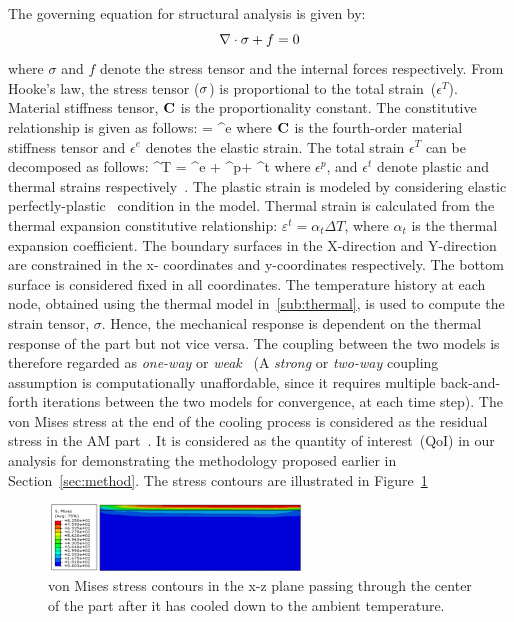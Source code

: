 The governing equation for structural analysis \cite{Megahed:2016} is given by:
%
\begin{equation}\label{eq_mechanical}
\nabla \cdot \mathbf{{\sigma}}+f = 0
\end{equation}
%
where $\sigma$ and $f$ denote the stress tensor and the internal forces respectively. From Hooke's law, the stress
tensor ($\mathbf{{\sigma}}$) is proportional to the total strain~($\epsilon^T$). Material stiffness tensor, $\mathbf{{C}}$ is the
proportionality constant. The constitutive relationship is given as follows:
%
\be
\mat{\sigma} = \epsilon^e
\ee
%
where $\mathbf{{C}}$ is the fourth-order material stiffness tensor and $\epsilon^e$ denotes
the elastic strain. The total strain 
$\epsilon^T$ can be decomposed as follows:
%
\be
\epsilon^T = \epsilon^e + \epsilon^p+ \epsilon^t
\ee
%
where $\epsilon^p$, and $\epsilon^t$ denote
plastic and thermal strains respectively~\cite{Megahed:2016}. 
The plastic strain is modeled by considering elastic 
perfectly-plastic~\cite{Zhao:2015} condition in the model. Thermal strain is calculated  from the thermal expansion 
constitutive relationship: $\varepsilon^t = \alpha_{t}\Delta T$, where $\alpha_t $ is the thermal expansion coefficient.
The boundary surfaces in the X-direction and Y-direction are constrained in the x-
coordinates and y-coordinates respectively. The bottom surface is considered fixed in all coordinates.
The temperature history at each node, obtained using the thermal model in~\ref{sub:thermal}, is used to
compute the strain tensor, $\sigma$. Hence, the mechanical response is dependent on the thermal response
of the part but not vice versa. The coupling between the two models is therefore regarded as \textit{one-way}
or \textit{weak}~\cite{Debroy:2017} (A \textit{strong} or \textit{two-way} coupling assumption is computationally
unaffordable, since it requires multiple back-and-forth iterations between the two models for convergence, at 
each time step). 
The von Mises stress at the end of the cooling process
is considered as the residual stress in the AM part~\cite{Vastola:2016}. 
It is considered as the quantity of interest~(QoI) in our analysis for 
demonstrating the methodology proposed earlier in Section~\ref{sec:method}. The stress contours are illustrated
in Figure~\ref{fig:subSmises} 
%
\begin{figure}[htbp]
\begin{center}
\includegraphics[width=0.6\textwidth]{./Figures/SMisesNom} 
\end{center}
\caption{von Mises stress contours in the x-z plane passing through the center of the part after it has cooled
down to the ambient temperature.}
\label{fig:subSmises}
\end{figure}
